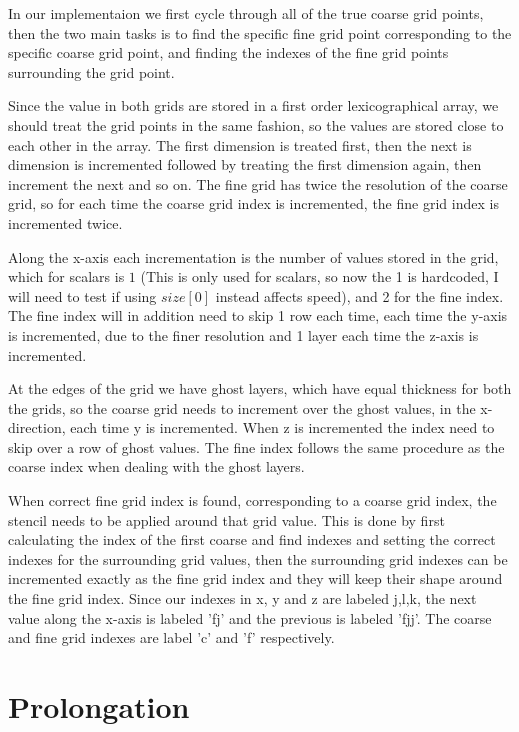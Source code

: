 	In our implementaion we first cycle through all of the true coarse grid points, then
	the two main tasks is to find the specific fine grid point corresponding to the specific
 	coarse grid point, and finding the indexes of the fine grid points surrounding the grid point.

	Since the value in both grids are stored in a first order lexicographical array, we should treat the
	grid points in the same fashion, so the values are stored close to each other in the array.
	The first dimension is treated first, then the next is dimension is incremented followed by
	treating the first dimension again, then increment the next and so on. The fine grid has twice the
	resolution of the coarse grid, so for each time the coarse grid index is incremented,
	the fine grid index is incremented twice.

	Along the x-axis each incrementation is the number of values stored in the grid, which for scalars
	is \(1\) (This is only used for scalars, so now the 1 is hardcoded, I will need to test
	if using \(size[0]\) instead affects speed), and 2 for the fine index. The fine index will in addition
	need to skip 1 row each time, each time the y-axis is incremented, due to the finer resolution and 1 layer each time
	the z-axis is incremented.

	At the edges of the grid we have ghost layers, which have equal thickness for both the grids, so the
	coarse grid needs to increment over the ghost values, in the x-direction, each time y is incremented.
	When z is incremented the index need to skip over a row of ghost values. The fine index follows
	the same procedure as the coarse index when dealing with the ghost layers.

	When correct fine grid index is found, corresponding to a coarse grid index, the stencil needs to be applied around
 	that grid value. This is done by first calculating the index of the first coarse and find indexes and setting
	the correct indexes for the surrounding grid values, then the surrounding grid indexes can be incremented
	exactly as the fine grid index and they will keep their shape around the fine grid index. Since our indexes
	in x, y and z are labeled j,l,k, the next value along the x-axis is labeled 'fj' and the previous is labeled
	'fjj'. The coarse and fine grid indexes are label 'c' and 'f' respectively.


\section{Prolongation}
	\label{sec:prol_simple}

